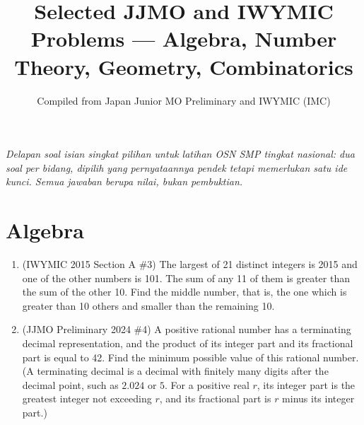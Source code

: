 \documentclass[11pt,letterpaper]{article}
\title{Selected JJMO and IWYMIC Problems --- Algebra, Number Theory, Geometry, Combinatorics}
\author{Compiled from Japan Junior MO Preliminary and IWYMIC (IMC)}
\date{}
\begin{document}
\maketitle

\renewcommand*\contentsname{Daftar Isi}
\tableofcontents

\newpage

\noindent
\textit{Delapan soal isian singkat pilihan untuk latihan OSN SMP tingkat nasional: dua soal per bidang, dipilih yang pernyataannya pendek tetapi memerlukan satu ide kunci. Semua jawaban berupa nilai, bukan pembuktian.}

\section*{Algebra}

\begin{enumerate}
    \item (IWYMIC 2015 Section A \#3) The largest of 21 distinct integers is 2015 and one of the other numbers is 101. The sum of any 11 of them is greater than the sum of the other 10. Find the middle number, that is, the one which is greater than 10 others and smaller than the remaining 10.

    \item (JJMO Preliminary 2024 \#4) A positive rational number has a terminating decimal representation, and the product of its integer part and its fractional part is equal to 42. Find the minimum possible value of this rational number. (A terminating decimal is a decimal with finitely many digits after the decimal point, such as $2.024$ or $5$. For a positive real $r$, its integer part is the greatest integer not exceeding $r$, and its fractional part is $r$ minus its integer part.)
\end{enumerate}
\end{document}
